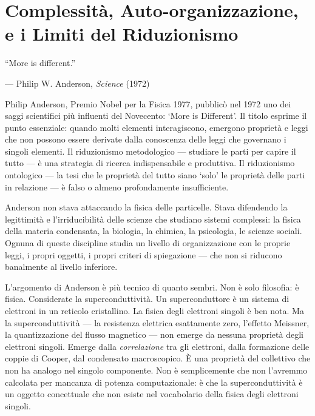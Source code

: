 \documentclass[12pt,a4paper,openany]{book}
\newcommand{\sezione}[1]{\vspace{1.2em}{\large\bfseries #1}\vspace{0.5em}\par}
\begin{document}
\chapter{Complessità, Auto-organizzazione, e i Limiti del Riduzionismo}

\epigraph{``More is different.''}{--- Philip W. Anderson, \textit{Science} (1972)}

\sezione{L'articolo più influente mai scritto in fisica della materia condensata}

Philip Anderson, Premio Nobel per la Fisica 1977, pubblicò nel 1972 uno dei saggi scientifici più influenti del Novecento: `More is Different'. Il titolo esprime il punto essenziale: quando molti elementi interagiscono, emergono proprietà e leggi che non possono essere derivate dalla conoscenza delle leggi che governano i singoli elementi. Il riduzionismo metodologico — studiare le parti per capire il tutto — è una strategia di ricerca indispensabile e produttiva. Il riduzionismo ontologico — la tesi che le proprietà del tutto siano `solo' le proprietà delle parti in relazione — è falso o almeno profondamente insufficiente.

Anderson non stava attaccando la fisica delle particelle. Stava difendendo la legittimità e l'irriducibilità delle scienze che studiano sistemi complessi: la fisica della materia condensata, la biologia, la chimica, la psicologia, le scienze sociali. Ognuna di queste discipline studia un livello di organizzazione con le proprie leggi, i propri oggetti, i propri criteri di spiegazione — che non si riducono banalmente al livello inferiore.

L'argomento di Anderson è più tecnico di quanto sembri. Non è solo filosofia: è fisica. Considerate la superconduttività. Un superconduttore è un sistema di elettroni in un reticolo cristallino. La fisica degli elettroni singoli è ben nota. Ma la superconduttività — la resistenza elettrica esattamente zero, l'effetto Meissner, la quantizzazione del flusso magnetico — non emerge da nessuna proprietà degli elettroni singoli. Emerge dalla \textit{correlazione} tra gli elettroni, dalla formazione delle coppie di Cooper, dal condensato macroscopico. È una proprietà del collettivo che non ha analogo nel singolo componente. Non è semplicemente che non l'avremmo calcolata per mancanza di potenza computazionale: è che la superconduttività è un oggetto concettuale che non esiste nel vocabolario della fisica degli elettroni singoli.
\end{document}
